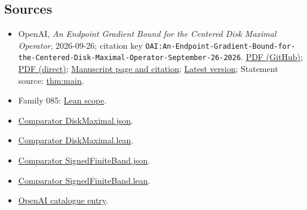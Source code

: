 \documentclass[11pt]{article}
\begin{document}
\subsection{Sources}
\begin{itemize}
\item OpenAI, \emph{An Endpoint Gradient Bound for the Centered Disk Maximal Operator}, 2026-09-26; citation key \texttt{OAI:An-Endpoint-Gradient-Bound-for-the-Centered-Disk-Maximal-Operator-September-26-2026}. \href{https://github.com/openai/math/blob/adc7f1241b42e322a6451854ab7e4b4c146bf78a/preprints/An-Endpoint-Gradient-Bound-for-the-Centered-Disk-Maximal-Operator-September-26-2026/article.pdf}{PDF (GitHub)}; \href{https://github.com/openai/math/raw/adc7f1241b42e322a6451854ab7e4b4c146bf78a/preprints/An-Endpoint-Gradient-Bound-for-the-Centered-Disk-Maximal-Operator-September-26-2026/article.pdf}{PDF (direct)}; \href{https://github.com/openai/math/blob/adc7f1241b42e322a6451854ab7e4b4c146bf78a/preprints/An-Endpoint-Gradient-Bound-for-the-Centered-Disk-Maximal-Operator-September-26-2026/README.md}{Manuscript page and citation}; \href{https://github.com/openai/math/blob/main/preprints/An-Endpoint-Gradient-Bound-for-the-Centered-Disk-Maximal-Operator-September-26-2026/article.pdf}{Latest version}; Statement source: \href{https://github.com/openai/math/blob/adc7f1241b42e322a6451854ab7e4b4c146bf78a/preprints/An-Endpoint-Gradient-Bound-for-the-Centered-Disk-Maximal-Operator-September-26-2026/build/sections/introduction.tex\#L19}{thm:main}.
\item Family 085: \href{https://github.com/openai/math/blob/adc7f1241b42e322a6451854ab7e4b4c146bf78a/lean/docs/085.md}{Lean scope}.
\item \href{https://github.com/openai/math/blob/adc7f1241b42e322a6451854ab7e4b4c146bf78a/lean/ComparatorChallenges/DiskMaximal.json}{Comparator DiskMaximal.json}.
\item \href{https://github.com/openai/math/blob/adc7f1241b42e322a6451854ab7e4b4c146bf78a/lean/ComparatorChallenges/DiskMaximal.lean}{Comparator DiskMaximal.lean}.
\item \href{https://github.com/openai/math/blob/adc7f1241b42e322a6451854ab7e4b4c146bf78a/lean/ComparatorChallenges/SignedFiniteBand.json}{Comparator SignedFiniteBand.json}.
\item \href{https://github.com/openai/math/blob/adc7f1241b42e322a6451854ab7e4b4c146bf78a/lean/ComparatorChallenges/SignedFiniteBand.lean}{Comparator SignedFiniteBand.lean}.
\item \href{https://github.com/openai/math/blob/adc7f1241b42e322a6451854ab7e4b4c146bf78a/CONTENTS.md}{OpenAI catalogue entry}.
\end{itemize}
\end{document}
